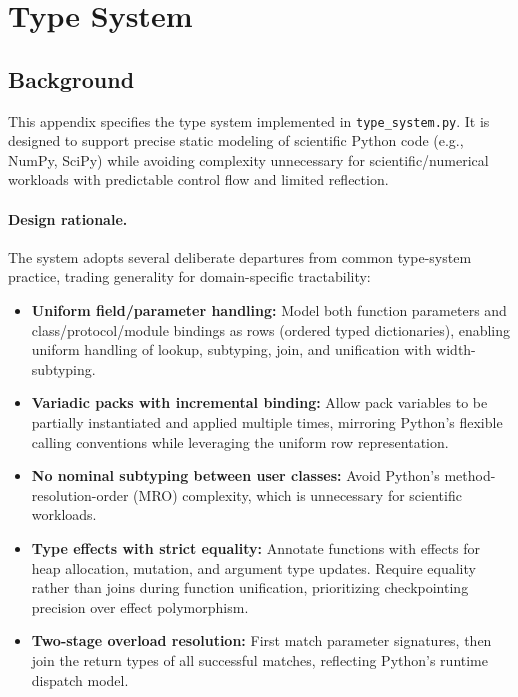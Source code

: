 \section{Type System}
\label{sec:appendix-typesystem}
\subsection{Background}
This appendix specifies the type system implemented in \texttt{type\_system.py}.  
It is designed to support precise static modeling of scientific Python code (e.g., NumPy, SciPy) while avoiding complexity unnecessary for scientific/numerical workloads with predictable control flow and limited reflection.
\paragraph{Design rationale.}
The system adopts several deliberate departures from common type-system practice, trading generality for domain-specific tractability:
\begin{itemize}
  \item \textbf{Uniform field/parameter handling:} Model both function parameters and class/protocol/module bindings as rows (ordered typed dictionaries), enabling uniform handling of lookup, subtyping, join, and unification with width-subtyping.
  \item \textbf{Variadic packs with incremental binding:} Allow pack variables to be partially instantiated and applied multiple times, mirroring Python's flexible calling conventions while leveraging the uniform row representation.
  \item \textbf{No nominal subtyping between user classes:} Avoid Python's method-resolution-order (MRO) complexity, which is unnecessary for scientific workloads.
  \item \textbf{Type effects with strict equality:} Annotate functions with effects for heap allocation, mutation, and argument type updates. Require equality rather than joins during function unification, prioritizing checkpointing precision over effect polymorphism.
  \item \textbf{Two-stage overload resolution:} First match parameter signatures, then join the return types of all successful matches, reflecting Python's runtime dispatch model.
\end{itemize}

